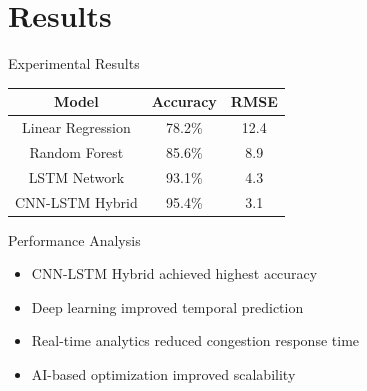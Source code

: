 \documentclass{beamer}
\begin{document}
	\section{Results}
	
	
	\begin{frame}{Experimental Results}
		
		\begin{table}
			
			\centering
			
			\begin{tabular}{|c|c|c|}
				
				\hline
				
				Model & Accuracy & RMSE \\
				
				\hline
				
				Linear Regression & 78.2\% & 12.4 \\
				
				\hline
				
				Random Forest & 85.6\% & 8.9 \\
				
				\hline
				
				LSTM Network & 93.1\% & 4.3 \\
				
				\hline
				
				CNN-LSTM Hybrid & 95.4\% & 3.1 \\
				
				\hline
				
			\end{tabular}
			
		\end{table}
		
	\end{frame}
	
	
	\begin{frame}{Performance Analysis}
		
		\begin{itemize}
			
			\item CNN-LSTM Hybrid achieved highest accuracy
			
			\item Deep learning improved temporal prediction
			
			\item Real-time analytics reduced congestion response time
			
			\item AI-based optimization improved scalability
			
		\end{itemize}
		
	\end{frame}
	
\end{document}
